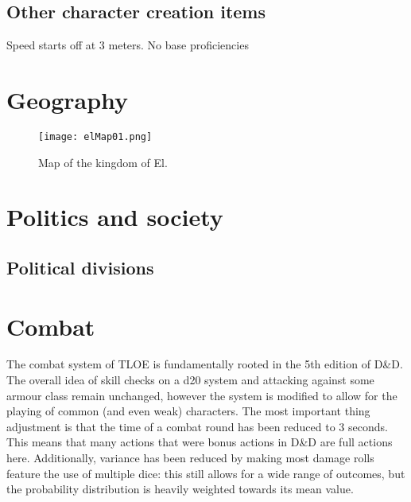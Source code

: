 \documentclass[letterpaper,12pt]{article}
\begin{document}
\subsection{Other character creation items}

Speed starts off at 3 meters. No base proficiencies 

\section{Geography}\label{Geography}

\begin{figure}[ht] 
        \centering \texttt{[image: elMap01.png]}
        \caption{Map of the kingdom of El.}
\end{figure}

\section{Politics and society}\label{Politics}

\subsection{Political divisions}\label{PoliticalDivisions}


\section{Combat}\label{Combat}

The combat system of TLOE is fundamentally rooted in the 5th edition of D\&D. The overall idea of skill checks on a d20 system and attacking against some armour class remain unchanged, however the system is modified to allow for the playing of common (and even weak) characters. The most important thing adjustment is that the time of a combat round has been reduced to 3 seconds. This means that many actions that were bonus actions in D\&D are full actions here. Additionally, variance has been reduced by making most damage rolls feature the use of multiple dice: this still allows for a wide range of outcomes, but the probability distribution is heavily weighted towards its mean value. 
\end{document}
